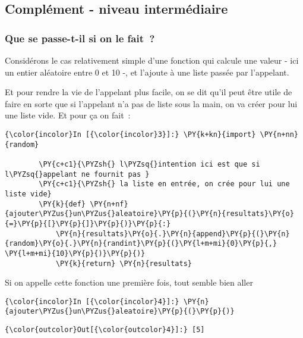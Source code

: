     \hypertarget{compluxe9ment---niveau-intermuxe9diaire}{%
\subsection{Complément - niveau
intermédiaire}\label{compluxe9ment---niveau-intermuxe9diaire}}

    \hypertarget{que-se-passe-t-il-si-on-le-fait}{%
\subsubsection{Que se passe-t-il si on le
fait~?}\label{que-se-passe-t-il-si-on-le-fait}}

    Considérons le cas relativement simple d'une fonction qui calcule une
valeur - ici un entier aléatoire entre 0 et 10 -, et l'ajoute à une
liste passée par l'appelant.

    Et pour rendre la vie de l'appelant plus facile, on se dit qu'il peut
être utile de faire en sorte que si l'appelant n'a pas de liste sous la
main, on va créer pour lui une liste vide. Et pour ça on fait~:

    \begin{Verbatim}[commandchars=\\\{\},frame=single,framerule=0.3mm,rulecolor=\color{cellframecolor}]
{\color{incolor}In [{\color{incolor}3}]:} \PY{k+kn}{import} \PY{n+nn}{random}
        
        \PY{c+c1}{\PYZsh{} l\PYZsq{}intention ici est que si l\PYZsq{}appelant ne fournit pas }
        \PY{c+c1}{\PYZsh{} la liste en entrée, on crée pour lui une liste vide}
        \PY{k}{def} \PY{n+nf}{ajouter\PYZus{}un\PYZus{}aleatoire}\PY{p}{(}\PY{n}{resultats}\PY{o}{=}\PY{p}{[}\PY{p}{]}\PY{p}{)}\PY{p}{:}
            \PY{n}{resultats}\PY{o}{.}\PY{n}{append}\PY{p}{(}\PY{n}{random}\PY{o}{.}\PY{n}{randint}\PY{p}{(}\PY{l+m+mi}{0}\PY{p}{,} \PY{l+m+mi}{10}\PY{p}{)}\PY{p}{)}
            \PY{k}{return} \PY{n}{resultats}
\end{Verbatim}


    Si on appelle cette fonction une première fois, tout semble bien aller

    \begin{Verbatim}[commandchars=\\\{\},frame=single,framerule=0.3mm,rulecolor=\color{cellframecolor}]
{\color{incolor}In [{\color{incolor}4}]:} \PY{n}{ajouter\PYZus{}un\PYZus{}aleatoire}\PY{p}{(}\PY{p}{)}
\end{Verbatim}


\begin{Verbatim}[commandchars=\\\{\},frame=single,framerule=0.3mm,rulecolor=\color{cellframecolor}]
{\color{outcolor}Out[{\color{outcolor}4}]:} [5]
\end{Verbatim}
            
